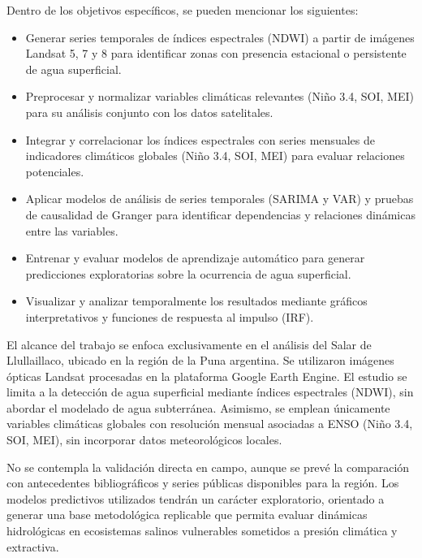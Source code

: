 Dentro de los objetivos específicos, se pueden mencionar los siguientes:

\begin{itemize}
    \item Generar series temporales de índices espectrales (NDWI) a partir de imágenes Landsat 5, 7 y 8 para identificar zonas con presencia estacional o persistente de agua superficial.
    \item Preprocesar y normalizar variables climáticas relevantes (Niño 3.4, SOI, MEI) para su análisis conjunto con los datos satelitales.
    \item Integrar y correlacionar los índices espectrales con series mensuales de indicadores climáticos globales (Niño 3.4, SOI, MEI) para evaluar relaciones potenciales.
    \item Aplicar modelos de análisis de series temporales (SARIMA y VAR) y pruebas de causalidad de Granger para identificar dependencias y relaciones dinámicas entre las variables.
    \item Entrenar y evaluar modelos de aprendizaje automático para generar predicciones exploratorias sobre la ocurrencia de agua superficial.
    \item Visualizar y analizar temporalmente los resultados mediante gráficos interpretativos y funciones de respuesta al impulso (IRF).
\end{itemize}

El alcance del trabajo se enfoca exclusivamente en el análisis del Salar de Llullaillaco, ubicado en la región de la Puna argentina. Se utilizaron imágenes ópticas Landsat procesadas en la plataforma Google Earth Engine. El estudio se limita a la detección de agua superficial mediante índices espectrales (NDWI), sin abordar el modelado de agua subterránea. Asimismo, se emplean únicamente variables climáticas globales con resolución mensual asociadas a ENSO (Niño 3.4, SOI, MEI), sin incorporar datos meteorológicos locales.

No se contempla la validación directa en campo, aunque se prevé la comparación con antecedentes bibliográficos y series públicas disponibles para la región. Los modelos predictivos utilizados tendrán un carácter exploratorio, orientado a generar una base metodológica replicable que permita evaluar dinámicas hidrológicas en ecosistemas salinos vulnerables sometidos a presión climática y extractiva.


